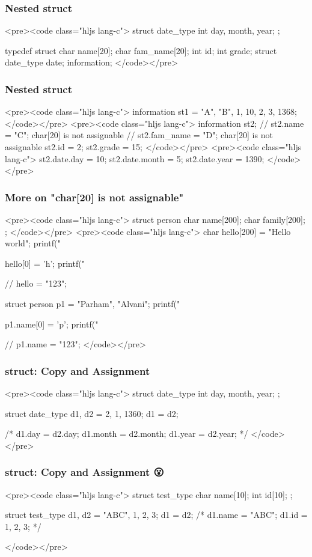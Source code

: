 \documentclass{../c-lecture}
\begin{document}
\begin{frame}
  \frametitle{Nested struct}
  <pre><code class="hljs lang-c">
struct date_type{
  int day, month, year;
};

typedef struct{
  char name[20];
  char fam_name[20];
  int id;
  int grade;
  struct date_type date;
} information;
  </code></pre>
\end{frame}
\begin{frame}
  \begin{frame}
    \frametitle{Nested struct}
    <pre><code class="hljs lang-c">
information st1 = {"A", "B", 1, 10, {2, 3, 1368}};
    </code></pre>
    <pre><code class="hljs lang-c">
information st2;
// st2.name = "C"; char[20] is not assignable
// st2.fam_name = "D"; char[20] is not assignable
st2.id = 2;
st2.grade = 15;
    </code></pre>
    <pre><code class="hljs lang-c">
st2.date.day = 10;
st2.date.month = 5;
st2.date.year = 1390;
    </code></pre>
  \end{frame}
  \begin{frame}
    \frametitle{More on "char[20] is not assignable"}
    <pre><code class="hljs lang-c">
struct person {
  char name[200];
  char family[200];
};
    </code></pre>
    <pre><code class="hljs lang-c">
char hello[200] = "Hello world";
printf("%

hello[0] = 'h';
printf("%

// hello = "123";

struct person p1 = {"Parham", "Alvani"};
printf("%

p1.name[0] = 'p';
printf("%

// p1.name = "123";
    </code></pre>
  \end{frame}
\end{frame}
\begin{frame}
  \frametitle{struct: Copy and Assignment}
  <pre><code class="hljs lang-c">
struct date_type{
  int day, month, year;
};

struct date_type d1, d2 = {2, 1, 1360};
d1 = d2;

/*
  d1.day = d2.day;
  d1.month = d2.month;
  d1.year = d2.year;
*/
  </code></pre>
\end{frame}
\begin{frame}
  \frametitle{struct: Copy and Assignment 😮}
  <pre><code class="hljs lang-c">
struct test_type{
  char name[10];
  int id[10];
};

struct test_type d1, d2 = {"ABC", {1, 2, 3}};
d1 = d2;
/*
 d1.name = "ABC";
 d1.id = {1, 2, 3};
*/

  </code></pre>
\end{frame}
\end{document}

